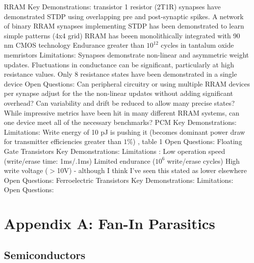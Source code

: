 \documentclass{article}
\begin{document}
\begin{outline}
    \1 RRAM \cite{ielmini2018brain}
        \2 Key Demonstrations: 
             transistor 1 resistor (2T1R) synapses have demonstrated STDP using overlapping pre and post-synaptic spikes.
            \3 A network of binary RRAM synapses implementing STDP has been demonstrated to learn simple patterns (4x4 grid)
            \3 RRAM has beeen monolithically integrated with 90 nm CMOS technology \cite{yin2019monolithically}
            \3 Endurance greater than $10^{12}$ cycles in tantalum oxide memristors \cite{zahoor2020resistive}
        \2 Limitations: 
            \3 Synapses demonstrate non-linear and asymmetric weight updates.
            \3 Fluctuations in conductance can be significant, particularly at high resistance values. 
            \3 Only 8 resistance states have been demonstrated in a single device \cite{zahoor2020resistive}
        \2 Open Questions:  
            \3 Can peripheral circuitry or using multiple RRAM devices per synapse adjust for the the non-linear updates without adding significant overhead?
            \3 Can variability and drift be reduced to allow many precise states?
            \3 While impressive metrics have been hit in many different RRAM systems, can one device meet all of the necessary benchmarks?
    \1 PCM
        \2 Key Demonstrations:
        \2 Limitations:
            \3 Write energy of 10 pJ is pushing it (becomes dominant power draw for transmitter efficiencies greater than $1\%$) \cite{zahoor2020resistive}, table 1
        \2 Open Questions:
    \1 Floating Gate Transistors
        \2 Key Demonstrations:
        \2 Limitations \cite{zahoor2020resistive}:
            \3 Low operation speed (write/erase time: 1ms/.1ms)
            \3 Limited endurance ($10^6$ write/erase cycles)
            \3 High write voltage ($>$10V) - although I think I've seen this stated as lower elsewhere 
        \2 Open Questions:
    \1 Ferroelectric Transistors
        \2 Key Demonstrations:
        \2 Limitations:
        \2 Open Questions:
    
\end{outline}

\section{Appendix A: Fan-In Parasitics}
\subsection{Semiconductors}
\end{document}
